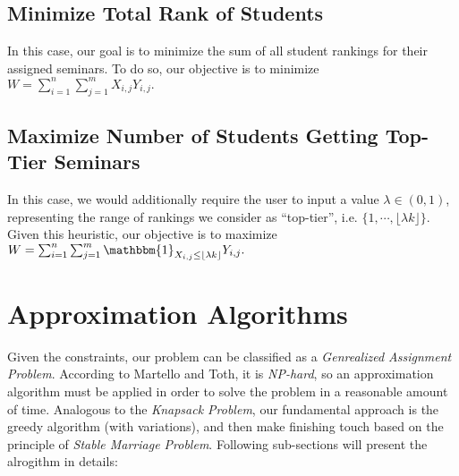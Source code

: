 \documentclass{article} %
\begin{document}
\subsection{Minimize Total Rank of Students}
    \par\qquad In this case, our goal is to minimize the sum of all student rankings for their assigned seminars. To do so, our objective is to minimize $W = \sum_{i=1}^{n}{\sum_{j=1}^{m}{X_{i,j}Y_{i,j}}}.$
\subsection{Maximize Number of Students Getting Top-Tier Seminars}
    \par\qquad In this case, we would additionally require the user to input a value $\lambda\in(0,1)$, representing the range of rankings we consider as ``top-tier'', i.e. $\{1,\cdots,\lfloor \lambda k\rfloor\}$. Given this heuristic, our objective is to maximize $W = \sum_{i=1}^{n}{\sum_{j=1}^{m}{\mathbbm{1}_{X_{i,j} \leq \lfloor \lambda k\rfloor}Y_{i,j}}}.$

%
%
\section{Approximation Algorithms}
    \par\qquad Given the constraints, our problem can be classified as a \emph{Genrealized Assignment Problem}. According to Martello and Toth\cite{mt90}, it is \emph{NP-hard}, so an approximation algorithm must be applied in order to solve the problem in a reasonable amount of time. Analogous to the \emph{Knapsack Problem}, our fundamental approach is the greedy algorithm (with variations), and then make finishing touch based on the principle of \emph{Stable Marriage Problem}. Following sub-sections will present the alrogithm in details:
\end{document}
